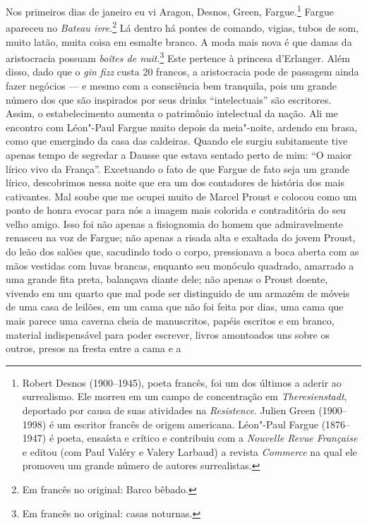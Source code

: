 Nos primeiros dias de janeiro eu vi Aragon,
Desnos, Green, Fargue.\footnote{Robert Desnos (1900--1945), poeta
  francês, foi um dos últimos a aderir ao surrealismo. Ele morreu em um
  campo de concentração em \emph{Theresienstadt}, deportado por causa de
  suas atividades na \emph{Resistence}. Julien Green (1900--1998) é um
  escritor francês de origem americana. Léon"-Paul Fargue (1876--1947) é
  poeta, ensaísta e crítico e contribuiu com a \emph{Nouvelle Revue
  Française} e editou (com Paul Valéry e Valery Larbaud) a revista
  \emph{Commerce} na qual ele promoveu um grande número de autores
  surrealistas. \versal{[N.~O.]}} Fargue apareceu no \emph{Bateau ivre}.\footnote{Em francês no original: Barco bêbado. \versal{[N.~T.]}} Lá dentro há
pontes de comando, vigias, tubos de som, muito latão, muita coisa em
esmalte branco. A moda mais nova é que damas da aristocracia possuam
\emph{boîtes de nuit}.\footnote{Em francês no original: casas noturnas. \versal{[N.~T.]}} Este pertence à princesa d'Erlanger. Além disso, dado que
o \emph{gin fizz} custa 20 francos, a aristocracia pode de passagem
ainda fazer negócios --- e mesmo com a consciência bem tranquila, pois um
grande número dos que são inspirados por seus drinks ``intelectuais'' são escritores.
Assim, o estabelecimento aumenta o patrimônio intelectual da nação. Ali me
encontro com Léon"-Paul Fargue muito depois da meia"-noite, ardendo em
brasa, como que emergindo da casa das caldeiras. Quando ele surgiu
subitamente tive apenas tempo de segredar a Dausse que estava sentado
perto de mim: ``O maior lírico vivo da França''. Excetuando o fato de
que Fargue de fato seja um grande lírico, descobrimos nessa noite que
era um dos contadores de história dos mais cativantes. Mal soube que me
ocupei muito de Marcel Proust e colocou como um ponto de honra evocar
para nós a imagem mais colorida e contraditória do seu velho amigo. Isso
foi não apenas a fisiognomia do homem que admiravelmente renasceu na voz
de Fargue; não apenas a risada alta e exaltada do jovem Proust, do leão
dos salões que, sacudindo todo o corpo, pressionava a boca aberta com as
mãos vestidas com luvas brancas, enquanto seu monóculo quadrado,
amarrado a uma grande fita preta, balançava diante dele; não apenas o
Proust doente, vivendo em um quarto que mal pode ser distinguido de um
armazém de móveis de uma casa de leilões, em um cama que não foi feita
por dias, uma cama que mais parece uma caverna cheia de manuscritos,
papéis escritos e em branco, material indispensável para poder escrever,
livros amontoados uns sobre os outros, presos na fresta entre a cama e a

